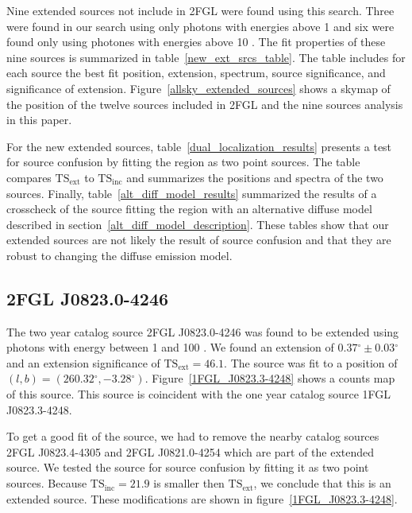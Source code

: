 \documentclass[12pt,preprint]{aastex}
\newcommand{\gev}{\text{GeV}\xspace}
\newcommand{\tsext}{{\ensuremath{\text{TS}_\text{ext}}}\xspace}
\newcommand{\tsinc}{\ensuremath{\text{TS}_\text{inc}}\xspace}
\renewcommand{\deg}{\ensuremath{^\circ}\xspace}
\begin{document}
Nine extended sources not include in 2FGL were found
using this search.  Three were found in our search using only photons
with energies above 1 \gev and six were found only using photones with
energies above 10 \gev.  The fit properties of these nine sources is
summarized in table~\ref{new_ext_srcs_table}.  The table includes for each
source the best fit position, extension, spectrum, source significance,
and significance of extension.  Figure~\ref{allsky_extended_sources}
shows a skymap of the position of the twelve sources included in 2FGL
and the nine sources analysis in this paper.

For the new extended sources, table~\ref{dual_localization_results}
presents a test for source confusion by fitting the region
as two point sources. The table compares \tsext
to \tsinc and summarizes the positions and spectra of the two sources.
Finally, table~\ref{alt_diff_model_results} summarized the results of
a crosscheck of the source fitting the region with an alternative diffuse
model described in section~\ref{alt_diff_model_description}.  These tables
show that our extended sources are not likely the result of source confusion
and that they are robust to changing the diffuse emission model.


\subsection{2FGL J0823.0-4246}
\label{section_2FGL_J0823.0-4246}


The two year catalog source 2FGL J0823.0-4246 was found to be
extended using photons with energy between 1 \gev and 100 \gev.
We found an extension of $0.37\deg\pm0.03\deg$ and an extension
significance of $\tsext=46.1$.  The source was fit to a position of
$(l,b)=(260.32\deg,-3.28\deg)$.  Figure~\ref{1FGL_J0823.3-4248} shows a
counts map of this source.  This source is coincident with the one year
catalog source 1FGL J0823.3-4248.

To get a good fit of the source, we had to remove the nearby catalog
sources 2FGL J0823.4-4305 and 2FGL J0821.0-4254 which are part of the
extended source.  We tested the source for source confusion by fitting
it as two point sources. Because $\tsinc=21.9$ is smaller then \tsext,
we conclude that this is an extended source.  
These modifications are shown in
figure~\ref{1FGL_J0823.3-4248}.
\end{document}
